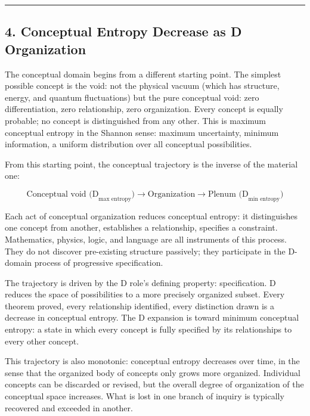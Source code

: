 \documentclass[
  11pt,
  letterpaper,
]{article}
\begin{document}
\begin{center}\rule{0.5\linewidth}{0.5pt}\end{center}

\subsection{4. Conceptual Entropy Decrease as D
Organization}\label{conceptual-entropy-decrease-as-d-organization}

The conceptual domain begins from a different starting point. The
simplest possible concept is the void: not the physical vacuum (which
has structure, energy, and quantum fluctuations) but the pure conceptual
void: zero differentiation, zero relationship, zero organization. Every
concept is equally probable; no concept is distinguished from any other.
This is maximum conceptual entropy in the Shannon sense: maximum
uncertainty, minimum information, a uniform distribution over all
conceptual possibilities.

From this starting point, the conceptual trajectory is the inverse of
the material one:

\[\text{Conceptual void (D}_\text{max entropy}\text{)} \longrightarrow \text{Organization} \longrightarrow \text{Plenum (D}_\text{min entropy}\text{)}\]

Each act of conceptual organization reduces conceptual entropy: it
distinguishes one concept from another, establishes a relationship,
specifies a constraint. Mathematics, physics, logic, and language are
all instruments of this process. They do not discover pre-existing
structure passively; they participate in the D-domain process of
progressive specification.

The trajectory is driven by the D role's defining property:
specification. D reduces the space of possibilities to a more precisely
organized subset. Every theorem proved, every relationship identified,
every distinction drawn is a decrease in conceptual entropy. The D
expansion is toward minimum conceptual entropy: a state in which every
concept is fully specified by its relationships to every other concept.

This trajectory is also monotonic: conceptual entropy decreases over
time, in the sense that the organized body of concepts only grows more
organized. Individual concepts can be discarded or revised, but the
overall degree of organization of the conceptual space increases. What
is lost in one branch of inquiry is typically recovered and exceeded in
another.
\end{document}
